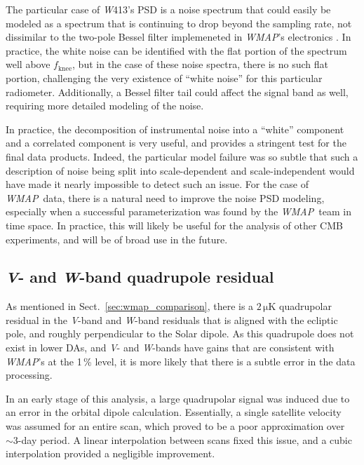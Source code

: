 \documentclass[twocolumn]{../../common/aa}
\def\WMAP{\emph{WMAP}}
\newcommand{\V}[0]{\textit V}
\newcommand{\W}[0]{\textit W}
\begin{document}

The particular case of \W413's PSD is a noise spectrum that could easily be modeled as a spectrum that is continuing to drop beyond the sampling rate, not dissimilar to the two-pole Bessel filter implemeneted in \WMAP's electronics \citep{jarosik2003:MAP}. In practice, the white noise can be identified with the flat portion of the spectrum well above $f_\mathrm{knee}$, but in the case of these noise spectra, there is no such flat portion, challenging the very existence of ``white noise'' for this particular radiometer. Additionally, a Bessel filter tail could affect the signal band as well, requiring more detailed modeling of the noise.

In practice, the decomposition of instrumental noise into a ``white'' component and a correlated component is very useful, and provides a stringent test for the final data products. Indeed, the particular model failure was so subtle that such a description of noise being split into scale-dependent and scale-independent would have made it nearly impossible to detect such an issue.
For the case of \WMAP\ data, there is a natural need to improve the noise PSD modeling, especially when a successful parameterization was found by the \WMAP\ team in time space. In practice, this will likely be useful for the analysis of other CMB experiments, and will be of broad use in the future.

\subsection{\V- and \W-band quadrupole residual}
\label{sec:quadres}

As mentioned in Sect.~\ref{sec:wmap_comparison}, there is a $2\,\mathrm{\mu K}$ quadrupolar residual in the \V-band and \W-band residuals that is aligned with the ecliptic pole, and roughly perpendicular to the Solar dipole. As this quadrupole does not exist in lower DAs, and \V- and \W-bands have gains that are consistent with \WMAP's at the 1\,\% level, it is more likely that there is a subtle error in the data processing.

In an early stage of this analysis, a large quadrupolar signal was induced due to an error in the orbital dipole calculation. Essentially, a single satellite velocity was assumed for an entire scan, which proved to be a poor approximation over $\sim3$-day period. A linear interpolation between scans fixed this issue, and a cubic interpolation provided a negligible improvement.
\end{document}
